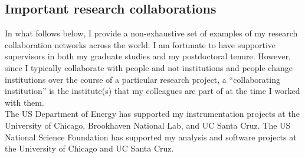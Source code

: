 \subsection{Important research collaborations}\label{ssec:important-research-collaborations}
In what follows below, I provide a non-exhaustive set of examples of my research collaboration networks across the world.
I am fortunate to have supportive supervisors in both my graduate studies and my postdoctoral tenure.
However, since I typically collaborate with people and not institutions and people change institutions over the course of a particular research project, a \enquote{collaborating institution} is the institute(s) that my colleagues are part of at the time I worked with them.\\

 The US Department of Energy has supported my instrumentation projects at the University of Chicago, Brookhaven National Lab, and UC Santa Cruz. The US National Science Foundation has supported my analysis and software projects at the University of Chicago and UC Santa Cruz.\\

\\


